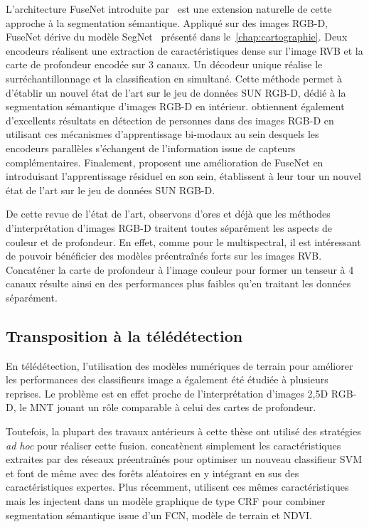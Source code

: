 L'architecture \gls{FuseNet} introduite par~\citet{hazirbas_fusenet_2016} est une extension naturelle de cette approche à la segmentation sémantique. Appliqué sur des images \gls{RGB-D}, FuseNet dérive du modèle SegNet~\cite{badrinarayanan_segnet_2017} présenté dans le~\cref{chap:cartographie}. Deux encodeurs réalisent une extraction de caractéristiques dense sur l'image \gls{RVB} et la carte de profondeur encodée sur 3 canaux. Un décodeur unique réalise le surréchantillonnage et la classification en simultané. Cette méthode permet à \citet{hazirbas_fusenet_2016} d'établir un nouvel état de l'art sur le jeu de données SUN RGB-D, dédié à la segmentation sémantique d'images \gls{RGB-D} en intérieur. \citet{guerry_look_2017} obtiennent également d'excellents résultats en détection de personnes dans des images \gls{RGB-D} en utilisant ces mécanismes d'apprentissage bi-modaux au sein desquels les encodeurs parallèles s'échangent de l'information issue de capteurs complémentaires. Finalement, \citet{lee_rdfnet_2017} proposent une amélioration de FuseNet en introduisant l'apprentissage résiduel en son sein, établissent à leur tour un nouvel état de l'art sur le jeu de données SUN RGB-D.

De cette revue de l'état de l'art, observons d'ores et déjà que les méthodes d'interprétation d'images \gls{RGB-D} traitent toutes séparément les aspects de couleur et de profondeur. En effet, comme pour le multispectral, il est intéressant de pouvoir bénéficier des modèles préentraînés forts sur les images \gls{RVB}. Concaténer la carte de profondeur à l'image couleur pour former un tenseur à 4 canaux résulte ainsi en des performances plus faibles qu'en traitant les données séparément.

\subsection{Transposition à la télédétection}

En télédétection, l'utilisation des modèles numériques de terrain pour améliorer les performances des classifieurs image a également été étudiée à plusieurs reprises. Le problème est en effet proche de l'interprétation d'images 2,5D \gls{RGB-D}, le \gls{MNT} jouant un rôle comparable à celui des cartes de profondeur.

Toutefois, la plupart des travaux antérieurs à cette thèse ont utilisé des stratégies \emph{ad hoc} pour réaliser cette fusion. \citet{lagrange_benchmarking_2015} concatènent simplement les caractéristiques extraites par des réseaux préentraînés pour optimiser un nouveau classifieur \gls{SVM} et \citet{paisitkriangkrai_effective_2015} font de même avec des forêts aléatoires en y intégrant en sus des caractéristiques expertes. Plus récemment, \citet{liu_dense_2017} utilisent ces mêmes caractéristiques mais les injectent dans un modèle graphique de type \gls{CRF} pour combiner segmentation sémantique issue d'un \gls{FCN}, modèle de terrain et \gls{NDVI}.

